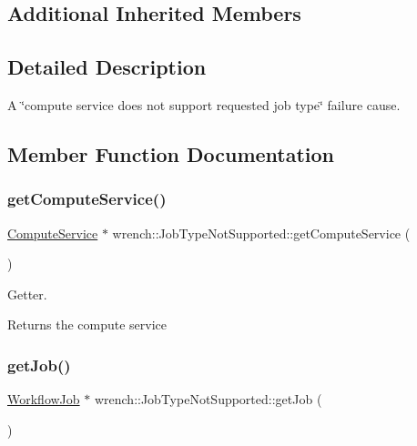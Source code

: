 \subsection*{Additional Inherited Members}


\subsection{Detailed Description}
A \char`\"{}compute service does not support requested job type\char`\"{} failure cause. 

\subsection{Member Function Documentation}
\mbox{\label{classwrench_1_1_job_type_not_supported_af2875bcec00418cd655609f1b4f12e55}} 
\subsubsection{\texorpdfstring{get\+Compute\+Service()}{getComputeService()}}
{\footnotesize\ttfamily \hyperlink{classwrench_1_1_compute_service}{Compute\+Service} $\ast$ wrench\+::\+Job\+Type\+Not\+Supported\+::get\+Compute\+Service (\begin{DoxyParamCaption}{ }\end{DoxyParamCaption})}



Getter. 

\begin{DoxyReturn}{Returns}
the compute service 
\end{DoxyReturn}
\mbox{\label{classwrench_1_1_job_type_not_supported_ade89cf1d1f2a676f5d552b909ef30e5e}} 
\subsubsection{\texorpdfstring{get\+Job()}{getJob()}}
{\footnotesize\ttfamily \hyperlink{classwrench_1_1_workflow_job}{Workflow\+Job} $\ast$ wrench\+::\+Job\+Type\+Not\+Supported\+::get\+Job (\begin{DoxyParamCaption}{ }\end{DoxyParamCaption})}



